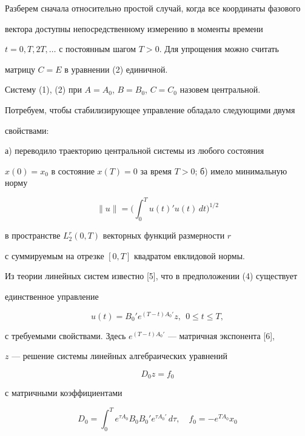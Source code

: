 Разберем сначала относительно простой случай, когда все координаты фазового


вектора доступны непосредственному измерению в моменты времени


$t=0,T,2T,\dotsc$ с постоянным шагом $T >0$. Для упрощения можно считать


матрицу $C=E$ в уравнении (2) единичной.





Систему (1), (2) при $A=A_0$, $B=B_0$, $C=C_0$ назовем центральной.





Потребуем, чтобы стабилизирующее управление обладало следующими двумя


свойствами:


а) переводило траекторию центральной системы из любого состояния


$x(0)=x_0$ в состояние $x(T)=0$ за время $ T>0$; б) имело минимальную норму


$$


\| u \| = \bigg(\int_{0}^{T} u(t)' u(t) \, dt \bigg)^{1/2}


$$


в пространстве $L^r_2(0,T)$ векторных функций размерности $r$


с суммируемым на отрезке $[0,T]$ квадратом евклидовой нормы.





Из теории линейных систем известно [5], что в предположении (4) существует


единственное управление


\begin{equation}


u(t)=B_0'e^{(T-t)A_0'} z, \ \ 0 \le t \le T,


\end{equation} 


с требуемыми свойствами. Здесь $e^{(T-t)A_0'}$ --- матричная экспонента [6],


$z$ --- решение системы линейных алгебраических уравнений


\begin{equation}


D_0 z = f_0


\end{equation}


с матричными коэффициентами


\begin{equation}


D_0 = \int_0^T e^{\tau A_0}B_0 B_0'e^{\tau A_0'} \, d \tau,


\quad f_0 = - e^{T A_0}x_0


\end{equation}


